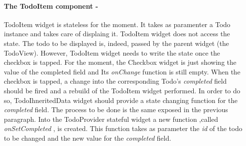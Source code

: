 \paragraph{The TodoItem component - }
\label{subpar:todo_app_inherited_widget_todoitem_component}
TodoItem widget is stateless for the moment. It takes as paramenter a Todo instance and takes care of displaing it. TodoItem widget does not access the state. The todo to be displayed is, indeed, passed by the parent widget (the TodoView). However, TodoItem widget needs to write the state once the checkbox is tapped. For the moment, the Checkbox widget is just showing the value of the completed field and Its \textit{onChange   }function is still empty. When the checkbox is tapped, a change into the corresponding Todo’s \textit{completed }field should be fired and a rebuild of the TodoItem widget performed. In order to do so, TodoIhneritedData widget should provide a state changing function for the \textit{completed} field. The process to be done is the same exposed in the previous paragraph. Into the TodoProvider stateful widget a new function ,called \textit{onSetCompleted  }, is created. This function takes as parameter the \textit{id} of the todo to be changed and the new value for the \textit{completed }field.
\mbox{}\\

